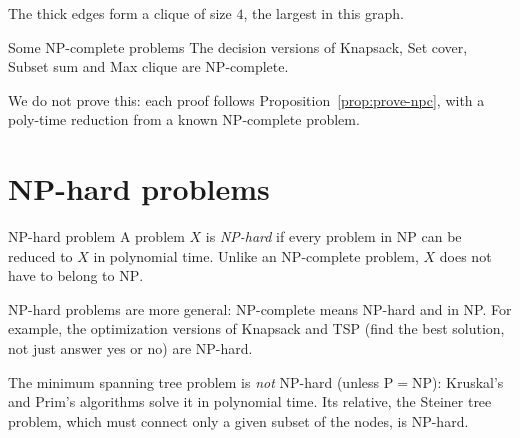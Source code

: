 \documentclass[a4paper,12pt,oneside]{report}
\begin{document}
\begin{center}

{\small The thick edges form a clique of size $4$, the largest in this
graph.}
\end{center}

\begin{framedprop}{Some NP-complete problems}\label{prop:npc-examples}
The decision versions of Knapsack, Set cover, Subset sum and Max clique
are NP-complete.
\end{framedprop}

We do not prove this: each proof follows Proposition~\ref{prop:prove-npc},
with a poly-time reduction from a known NP-complete problem.

\section{NP-hard problems}

\begin{frameddefn}{NP-hard problem}\label{def:np-hard}
A problem $X$ is \emph{NP-hard} if every problem in $\mathrm{NP}$ can
be reduced to $X$ in polynomial time. Unlike an NP-complete problem,
$X$ does not have to belong to $\mathrm{NP}$.
\end{frameddefn}

NP-hard problems are more general: NP-complete means NP-hard and in
NP. For example, the optimization versions of Knapsack and TSP (find
the best solution, not just answer yes or no) are NP-hard.

\begin{notebox}
The minimum spanning tree problem is \emph{not} NP-hard (unless
$\mathrm{P}=\mathrm{NP}$): Kruskal's and Prim's algorithms solve it in
polynomial time. Its relative, the Steiner tree problem, which must
connect only a given subset of the nodes, is NP-hard.
\end{notebox}
\end{document}
